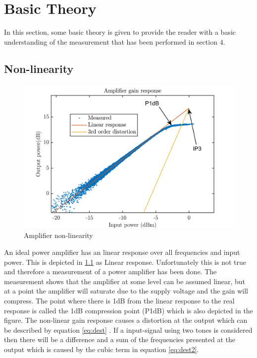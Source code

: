 \chapter{Basic Theory}\label{ch:1}

In this section, some basic theory is given to provide the reader with a basic understanding of the measurement that has been performed in section 4. 

\section{Non-linearity}

\begin{figure}[H]
\centering 
\includegraphics[scale = 0.8]{figures/ch1/amp_lin.png}
\caption{Amplifier non-linearity}
\label{fig:amp_lin}
\end{figure} 

An ideal power amplifier has an linear response over all frequencies and input power. This is depicted in \ref{fig:amp_lin} as Linear response. Unfortunately this is not true and therefore a measurement of a power amplifier has been done. The measurement shows that the amplifier at some level can be assumed linear, but at a point the amplifier will saturate due to the supply voltage and the gain will compress. The point where there is 1dB from the linear response to the real response is called the 1dB compression point (P1dB) which is also depicted in the figure. The non-linear gain response causes a distortion at the output which can be described by equation \ref{eq:dest} \citep{NI}. If a input-signal using two tones is considered then there will be a difference and a sum of the frequencies presented at the output which is caused by the cubic term in equation \ref{eq:dest2}.

